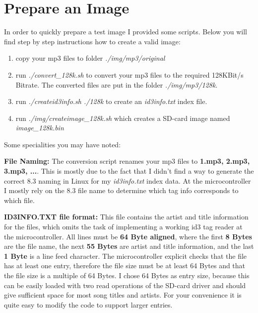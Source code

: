 \documentclass[12pt,a4paper,titlepage,oneside]{article}
\begin{document}
\section{Prepare an Image}

In order to quickly prepare a test image I provided some scripts. Below you will find step by step instructions how to create a valid image:

\begin{enumerate}
	\item copy your mp3 files to folder {\it ./img/mp3/original}
	\item run {\it ./convert\_128k.sh} to convert your mp3 files to the required 128KBit/s Bitrate. The converted files are put in the folder {\it ./img/mp3/128k}.
	\item run {\it ./createid3info.sh ./128k} to create an {\it id3info.txt} index file.
	\item run {\it ./img/createimage\_128k.sh} which creates a SD-card image named {\it image\_128k.bin}
\end{enumerate}

Some specialities you may have noted:

{\bf File Naming:} The conversion script renames your mp3 files to {\bf 1.mp3, 2.mp3, 3.mp3, ...}. This is mostly due to the fact that I didn't find a way to generate the correct 8.3 naming in Linux for my {\it id3info.txt} index data. At the microcontroller I mostly rely on the 8.3 file name to determine which tag info corresponds to which file.

{\bf ID3INFO.TXT file format:} This file contains the artist and title information for the files, which omits the task of implementing a working id3 tag reader at the microcontroller. All lines must be {\bf 64 Byte aligned}, where the first {\bf 8 Bytes } are the file name, the next {\bf 55 Bytes } are artist and title information, and the last {\bf 1 Byte} is a line feed character. The microcontroller explicit checks that the file has at least one entry, therefore the file size must be at least 64 Bytes and that the file size is a multiple of 64 Bytes. I chose 64 Bytes as entry size, because this can be easily loaded with two read operations of the SD-card driver and should give sufficient space for most song titles and artists. For your convenience it is quite easy to modify the code to support larger entries.
\end{document}
